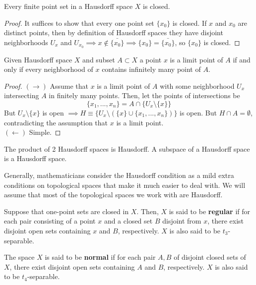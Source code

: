 \documentclass{article}
\begin{document}
    \begin{theorem}
    Every finite point set in a Hausdorff space $X$ is closed. 
    \end{theorem}
    \begin{proof}
    It suffices to show that every one point set $\{x_0\}$ is closed. If $x$ and $x_0$ are distinct points, then by definition of Hausdorff spaces they have disjoint neighborhoods $U_x$ and $U_{x_0} \implies x \not\in \bar{\{x_0\}} \implies \{x_0\} = \bar{\{x_0\}}$, so $\{x_0\}$ is closed. 
    \end{proof}

    \begin{theorem}
    Given Hausdorff space $X$ and subset $A \subset X$ a point $x$ is a limit point of $A$ if and only if every neighborhood of $x$ contains infinitely many point of $A$. 
    \end{theorem}
    \begin{proof}
    $(\rightarrow)$ Assume that $x$ is a limit point of $A$ with some neighborhood $U_x$ intersecting $A$ in finitely many points. Then, let the points of intersections be 
    \[\{x_1, ..., x_n\} = A \cap \{U_x \setminus \{x\} \} \]
    But $U_x \setminus \{x\}$ is open $\implies H \equiv \{U_x \setminus ( \{x\} \cup \{x_1, ..., x_n\})\}$ is open. But $H \cap A = \emptyset$, contradicting the assumption that $x$ is a limit point. \\
    $(\leftarrow)$ Simple. 
    \end{proof}

    \begin{theorem}
    The product of 2 Hausdorff spaces is Hausdorff. A subspace of a Hausdorff space is a Hausdorff space. 
    \end{theorem}

    Generally, mathematicians consider the Hausdorff condition as a mild extra conditions on topological spaces that make it much easier to deal with. We will assume that most of the topological spaces we work with are Hausdorff. 


    \begin{definition}
    Suppose that one-point sets are closed in $X$. Then, $X$ is said to be \textbf{regular} if for each pair consisting of a point $x$ and a closed set $B$ disjoint from $x$, there exist disjoint open sets containing $x$ and $B$, respectively. $X$ is also said to be $t_3$-separable. 
    \end{definition}

    \begin{definition}
    The space $X$ is said to be \textbf{normal} if for each pair $A, B$ of disjoint closed sets of $X$, there exist disjoint open sets containing $A$ and $B$, respectively. $X$ is also said to be $t_4$-separable. 
    \end{definition}
\end{document}
